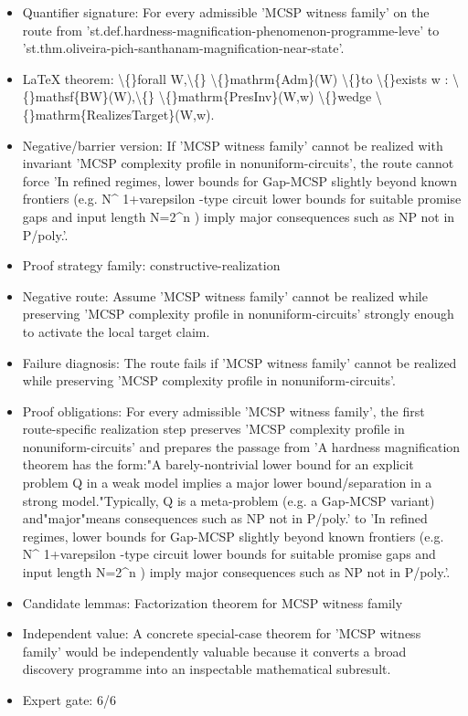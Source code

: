 \documentclass[11pt]{article}
\begin{document}
\begin{itemize}
\item Quantifier signature: For every admissible 'MCSP witness family' on the route from 'st.def.hardness-magnification-phenomenon-programme-leve' to 'st.thm.oliveira-pich-santhanam-magnification-near-state'.
\item LaTeX theorem: \textbackslash\{\}forall W,\textbackslash\{\} \textbackslash\{\}mathrm\{Adm\}(W) \textbackslash\{\}to \textbackslash\{\}exists w : \textbackslash\{\}mathsf\{BW\}(W),\textbackslash\{\} \textbackslash\{\}mathrm\{PresInv\}(W,w) \textbackslash\{\}wedge \textbackslash\{\}mathrm\{RealizesTarget\}(W,w).
\item Negative/barrier version: If 'MCSP witness family' cannot be realized with invariant 'MCSP complexity profile in nonuniform-circuits', the route cannot force 'In refined regimes, lower bounds for Gap-MCSP slightly beyond known frontiers (e.g. N\textasciicircum{} 1+varepsilon -type circuit lower bounds for suitable promise gaps and input length N=2\textasciicircum{}n ) imply major consequences such as NP not in P/poly.'.
\item Proof strategy family: constructive-realization
\item Negative route: Assume 'MCSP witness family' cannot be realized while preserving 'MCSP complexity profile in nonuniform-circuits' strongly enough to activate the local target claim.
\item Failure diagnosis: The route fails if 'MCSP witness family' cannot be realized while preserving 'MCSP complexity profile in nonuniform-circuits'.
\item Proof obligations: For every admissible 'MCSP witness family', the first route-specific realization step preserves 'MCSP complexity profile in nonuniform-circuits' and prepares the passage from 'A hardness magnification theorem has the form:"A barely-nontrivial lower bound for an explicit problem Q in a weak model implies a major lower bound/separation in a strong model."Typically, Q is a meta-problem (e.g. a Gap-MCSP variant) and"major"means consequences such as NP not in P/poly.' to 'In refined regimes, lower bounds for Gap-MCSP slightly beyond known frontiers (e.g. N\textasciicircum{} 1+varepsilon -type circuit lower bounds for suitable promise gaps and input length N=2\textasciicircum{}n ) imply major consequences such as NP not in P/poly.'.
\item Candidate lemmas: Factorization theorem for MCSP witness family
\item Independent value: A concrete special-case theorem for 'MCSP witness family' would be independently valuable because it converts a broad discovery programme into an inspectable mathematical subresult.
\item Expert gate: 6/6
\end{itemize}
\end{document}
